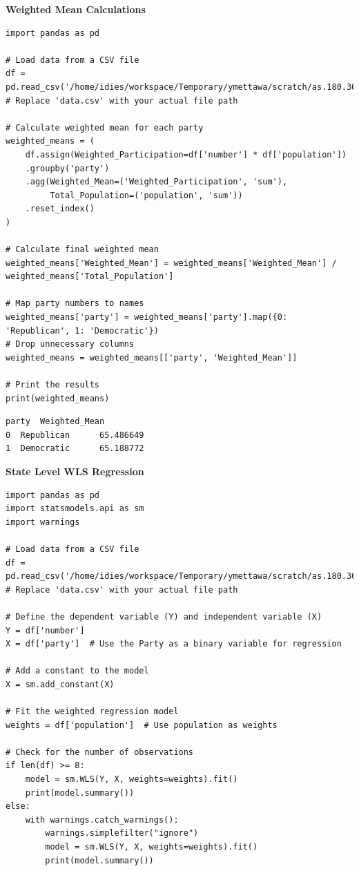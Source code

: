 \textbf{Weighted Mean Calculations}

\begin{verbatim}
import pandas as pd

# Load data from a CSV file
df = pd.read_csv('/home/idies/workspace/Temporary/ymettawa/scratch/as.180.369/contrib/yazzymettawa/Paper_Final/Data/stateLFPR.csv')  # Replace 'data.csv' with your actual file path

# Calculate weighted mean for each party
weighted_means = (
    df.assign(Weighted_Participation=df['number'] * df['population'])
    .groupby('party')
    .agg(Weighted_Mean=('Weighted_Participation', 'sum'),
         Total_Population=('population', 'sum'))
    .reset_index()
)

# Calculate final weighted mean
weighted_means['Weighted_Mean'] = weighted_means['Weighted_Mean'] / weighted_means['Total_Population']

# Map party numbers to names
weighted_means['party'] = weighted_means['party'].map({0: 'Republican', 1: 'Democratic'})
# Drop unnecessary columns
weighted_means = weighted_means[['party', 'Weighted_Mean']]

# Print the results
print(weighted_means)
\end{verbatim}

\begin{verbatim}
party  Weighted_Mean
0  Republican      65.486649
1  Democratic      65.188772
\end{verbatim}

\textbf{State Level WLS Regression}

\begin{verbatim}
import pandas as pd
import statsmodels.api as sm
import warnings

# Load data from a CSV file
df = pd.read_csv('/home/idies/workspace/Temporary/ymettawa/scratch/as.180.369/contrib/yazzymettawa/Paper_Final/Data/stateLFPR.csv')  # Replace 'data.csv' with your actual file path

# Define the dependent variable (Y) and independent variable (X)
Y = df['number']
X = df['party']  # Use the Party as a binary variable for regression

# Add a constant to the model
X = sm.add_constant(X)

# Fit the weighted regression model
weights = df['population']  # Use population as weights

# Check for the number of observations
if len(df) >= 8:
    model = sm.WLS(Y, X, weights=weights).fit()
    print(model.summary())
else:
    with warnings.catch_warnings():
        warnings.simplefilter("ignore")
        model = sm.WLS(Y, X, weights=weights).fit()
        print(model.summary())
\end{verbatim}


